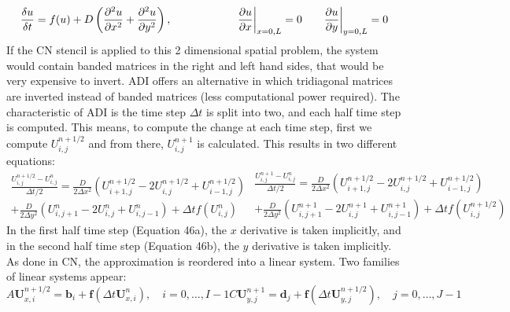 \begin{equation}
    \frac{\delta u}{\delta t} =  f(u) + D\left(\frac{\partial^{2} {u}}{\partial {x}^{2}} + \frac{\partial^{2} {u}}{\partial {y}^{2}}\right) ,   \quad \quad \quad \quad \quad \quad \pdv{u}{x}\biggr\rvert_{x=0,L}=0 \quad \quad \pdv{u}{y}\biggr\rvert_{y=0,L}=0
\end{equation}
If the CN stencil is applied to this 2 dimensional spatial problem, the system would contain banded matrices in the right and left hand sides, that would be very expensive to invert. \acrshort{ADI} offers an alternative in which tridiagonal matrices are inverted instead of banded matrices (less computational power required). The characteristic of \acrshort{ADI} is the time step $\Delta t$ is split into two, and each half time step is computed. This means, to compute the change at each time step, first we compute $U^{n+1/2}_{i,j} $ and from there,    $U^{n+1}_{i,j} $ is calculated. This results in two different equations:
\begin{subequations}
    \begin{equation}
        \begin{split}
            \frac{U^{n+1/2}_{i,j} - U^{n}_{i,j}}{\Delta t/2} = \frac{D}{2\Delta x^{2}}\left( U^{n+1/2}_{i+1,j} -  2U^{n+1/2}_{i,j} + U^{n+1/2}_{i-1,j}\right)  \\+ \frac{D}{2\Delta y^{2}}\left( U^{n}_{i,j+1} -  2U^{n}_{i,j} + U^{n}_{i,j-1}\right)  + \Delta t f(U^{n}_{i,j})
        \end{split}
    \end{equation}
    \begin{equation}
        \begin{split}
            \frac{U^{n+1}_{i,j} - U^{n}_{i,j}}{\Delta t/2} = \frac{D}{2\Delta x^{2}}\left( U^{n+1/2}_{i+1,j} -  2U^{n+1/2}_{i,j} + U^{n+1/2}_{i-1,j}\right)  \\+ \frac{D}{2\Delta y^{2}}\left( U^{n+1}_{i,j+1} -  2U^{n+1}_{i,j} + U^{n+1}_{i,j-1}\right)  + \Delta t f(U^{n+1/2}_{i,j})
        \end{split}
    \end{equation}
\end{subequations}
In the first half time step (Equation 46a), the $x$ derivative is taken implicitly, and in the second half time step (Equation 46b), the $y$ derivative is taken implicitly. As done in \acrshort{CN}, the approximation is reordered into a linear system. Two families of linear systems appear:
\begin{subequations}
    \begin{equation}
        A\textbf{U}^{n+1/2}_{x,i} = \textbf{b}_{i} + \textbf{f}(\Delta t \textbf{U}^{n}_{x,i}), \quad i=0,\ldots,I-1
    \end{equation}
    \begin{equation}
        C\textbf{U}^{n+1}_{y,j} = \textbf{d}_{j} + \textbf{f}(\Delta t \textbf{U}^{n+1/2}_{y,j}), \quad j=0,\ldots,J-1
    \end{equation}
\end{subequations}
